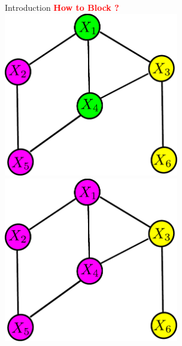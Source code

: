 \documentclass[serif,mathserif,final]{beamer}
\newcommand{\itemlinespace}{0.22in}
\newcommand{\paralinespace}{0.5in}
\newcommand{\insertlinespace}{\vspace{\itemlinespace}}
\newcommand{\insertparaspace}{\vspace{\paralinespace}}
\newcommand{\semititle}[1]{\textcolor{red}{\Huge \textbf{#1}}}
\begin{document}
\begin{frame}{}
\begin{columns}[t]
\begin{column}{0.49\linewidth}
\begin{block}{\Huge Introduction}
{        \insertparaspace
        \semititle{How to Block ?} \\
          \insertlinespace
          \newcommand{\localimgwidtha}{3in}
          \hspace{0.5in}
          \includegraphics[width=\localimgwidtha]{figs/bg1} \hspace{0.5in}
          \includegraphics[width=\localimgwidtha]{figs/bg2} \hspace{0.5in} 
}
\end{block}
\end{column}
\end{columns}
\end{frame}
\end{document}

